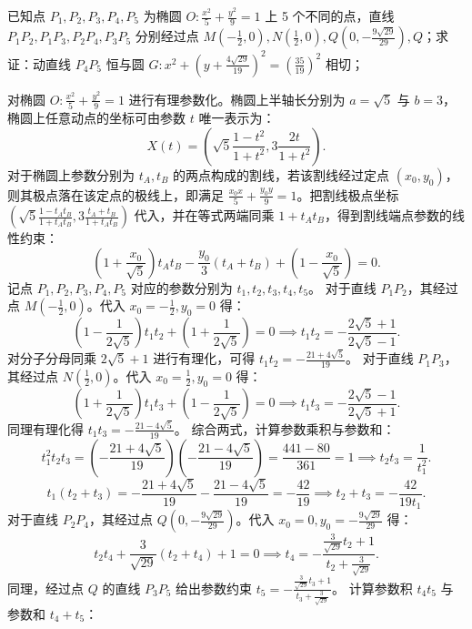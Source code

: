 \begin{example}
已知点 \(P_1,P_2,P_3,P_4,P_5\) 为椭圆 \(O: \frac{x^2}{5} + \frac{y^2}{9} = 1\) 上 5 个不同的点，直线 \(P_1P_2,P_1P_3,P_2P_4,P_3P_5\) 分别经过点 \(M\left(-\frac{1}{2},0\right),N\left(\frac{1}{2},0\right),Q\left(0,-\frac{9\sqrt{29}}{29}\right),Q\)；求证：动直线 \(P_4P_5\) 恒与圆 \(G: x^2 + \left(y + \frac{4\sqrt{29}}{19}\right)^2 = \left(\frac{35}{19}\right)^2\) 相切；
\end{example}
\begin{solution}
对椭圆 $O: \frac{x^2}{5} + \frac{y^2}{9} = 1$ 进行有理参数化。椭圆上半轴长分别为 $a = \sqrt{5}$ 与 $b = 3$，椭圆上任意动点的坐标可由参数 $t$ 唯一表示为：
\[
X(t) = \left( \sqrt{5}\frac{1-t^2}{1+t^2}, 3\frac{2t}{1+t^2} \right).
\]
对于椭圆上参数分别为 $t_A,t_B$ 的两点构成的割线，若该割线经过定点 $(x_0,y_0)$，则其极点落在该定点的极线上，即满足 $\frac{x_0 x}{5}+\frac{y_0 y}{9}=1$。把割线极点坐标 $\left( \sqrt{5}\frac{1-t_At_B}{1+t_At_B}, 3\frac{t_A+t_B}{1+t_At_B} \right)$ 代入，并在等式两端同乘 $1+t_A t_B$，得到割线端点参数的线性约束：
\[
\left(1 + \frac{x_0}{\sqrt{5}}\right) t_A t_B - \frac{y_0}{3} (t_A+t_B) + \left(1 - \frac{x_0}{\sqrt{5}}\right) = 0.
\]
记点 $P_1, P_2, P_3, P_4, P_5$ 对应的参数分别为 $t_1, t_2, t_3, t_4, t_5$。
对于直线 $P_1P_2$，其经过点 $M\left(-\frac{1}{2},0\right)$。代入 $x_0 = -\frac{1}{2}, y_0 = 0$ 得：
\[
\left(1 - \frac{1}{2\sqrt{5}}\right)t_1 t_2 + \left(1 + \frac{1}{2\sqrt{5}}\right) = 0 \implies t_1 t_2 = -\frac{2\sqrt{5}+1}{2\sqrt{5}-1}.
\]
对分子分母同乘 $2\sqrt{5}+1$ 进行有理化，可得 $t_1 t_2 = -\frac{21+4\sqrt{5}}{19}$。
对于直线 $P_1P_3$，其经过点 $N\left(\frac{1}{2},0\right)$。代入 $x_0 = \frac{1}{2}, y_0 = 0$ 得：
\[
\left(1 + \frac{1}{2\sqrt{5}}\right)t_1 t_3 + \left(1 - \frac{1}{2\sqrt{5}}\right) = 0 \implies t_1 t_3 = -\frac{2\sqrt{5}-1}{2\sqrt{5}+1}.
\]
同理有理化得 $t_1 t_3 = -\frac{21-4\sqrt{5}}{19}$。
综合两式，计算参数乘积与参数和：
\[
t_1^2 t_2 t_3 = \left(-\frac{21+4\sqrt{5}}{19}\right) \left(-\frac{21-4\sqrt{5}}{19}\right) = \frac{441-80}{361} = 1 \implies t_2 t_3 = \frac{1}{t_1^2}.
\]
\[
t_1(t_2 + t_3) = -\frac{21+4\sqrt{5}}{19} - \frac{21-4\sqrt{5}}{19} = -\frac{42}{19} \implies t_2 + t_3 = -\frac{42}{19 t_1}.
\]
对于直线 $P_2P_4$，其经过点 $Q\left(0,-\frac{9\sqrt{29}}{29}\right)$。代入 $x_0 = 0, y_0 = -\frac{9\sqrt{29}}{29}$ 得：
\[
t_2 t_4 + \frac{3}{\sqrt{29}}(t_2 + t_4) + 1 = 0 \implies t_4 = -\frac{\frac{3}{\sqrt{29}} t_2 + 1}{t_2 + \frac{3}{\sqrt{29}}}.
\]
同理，经过点 $Q$ 的直线 $P_3P_5$ 给出参数约束 $t_5 = -\frac{\frac{3}{\sqrt{29}} t_3 + 1}{t_3 + \frac{3}{\sqrt{29}}}$。
计算参数积 $t_4 t_5$ 与参数和 $t_4 + t_5$：

\end{solution}
